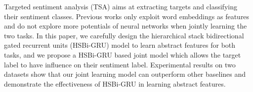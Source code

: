 Targeted sentiment analysis (TSA) aims at extracting targets and classifying their sentiment classes. Previous works only exploit word embeddings as features and do not explore more potentials of neural networks when jointly learning the two tasks. In this paper, we carefully design the hierarchical stack bidirectional gated recurrent units (HSBi-GRU) model to learn abstract features for both tasks, and we propose a HSBi-GRU based  joint model which allows the target label to have influence on their sentiment label. Experimental results on two datasets show that our joint learning model can outperform other baselines and demonstrate the effectiveness of HSBi-GRU in learning abstract features.
